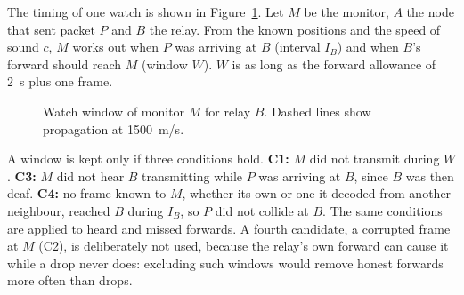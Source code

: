 \documentclass[conference]{IEEEtran}
\begin{document}
The timing of one watch is shown in Figure~\ref{fig:window}. Let $M$ be the monitor, $A$ the node that sent packet $P$ and $B$ the relay. From the known positions and the speed of sound $c$, $M$ works out when $P$ was arriving at $B$ (interval $I_B$) and when $B$'s forward should reach $M$ (window $W$). $W$ is as long as the forward allowance of 2~s plus one frame.

\begin{figure}[t]\centering
{}
\caption{Watch window of monitor $M$ for relay $B$. Dashed lines show propagation at 1500~m/s.}\label{fig:window}
\end{figure}

A window is kept only if three conditions hold. \textbf{C1:} $M$ did not transmit during $W$. \textbf{C3:} $M$ did not hear $B$ transmitting while $P$ was arriving at $B$, since $B$ was then deaf. \textbf{C4:} no frame known to $M$, whether its own or one it decoded from another neighbour, reached $B$ during $I_B$, so $P$ did not collide at $B$. The same conditions are applied to heard and missed forwards. A fourth candidate, a corrupted frame at $M$ (C2), is deliberately not used, because the relay's own forward can cause it while a drop never does: excluding such windows would remove honest forwards more often than drops.
\end{document}
